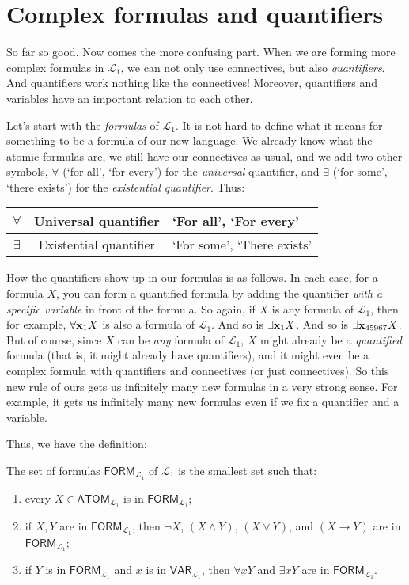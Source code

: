 \section{Complex formulas and quantifiers}

So far so good. Now comes the more confusing part. When we are forming more complex formulas in $\mathcal{L}_1$, we can not only use connectives, but also \textit{quantifiers}. And quantifiers work nothing like the connectives! Moreover, quantifiers and variables have an important relation to each other. 

Let's start with the \textit{formulas} of $\mathcal{L}_1$. It is not hard to define what it means for something to be a formula of our new language. We already know what the atomic formulas are, we still have our connectives as usual, and we add two other symbols, $\forall$ (`for all', `for every') for the \textit{universal} quantifier, and $\exists$ (`for some', `there exists') for the \textit{existential quantifier}. Thus:

\begin{center}
	\begin{tabular}{c|c|l}
		$\forall$ & Universal quantifier &`For all', `For every'\\\hline
		$\exists$ & Existential quantifier & `For some', `There exists'  
	\end{tabular}
\end{center}

How the quantifiers show up in our formulas is as follows. In each case, for a formula $X$, you can form a quantified formula by adding the quantifier \textit{with a specific variable} in front of the formula. So again, if $X$ is any formula of $\mathcal{L}_1$, then for example, $\forall \mathbf{x}_{1} X$ is also a formula of $\mathcal{L}_1$. And so is $\exists \mathbf{x}_{1} X$. And so is $\exists \mathbf{x}_{45967} X$. But of course, since $X$ can be \textit{any} formula of $\mathcal{L}_1$, $X$ might already be a \textit{quantified} formula (that is, it might already have quantifiers), and it might even be a complex formula with quantifiers and connectives (or just connectives). So this new rule of ours gets us infinitely many new formulas in a very strong sense. For example, it gets us infinitely many new formulas even if we fix a quantifier and a variable. 

Thus, we have the definition:

\begin{defn}[Formulas]
The set of formulas $\textsf{FORM}_{\mathcal{L}_1}$ of $\mathcal{L}_1$ is the smallest set such that: 
%
\begin{enumerate}
	\item every $X \in \textsf{ATOM}_{\mathcal{L}_1}$ is in $\textsf{FORM}_{\mathcal{L}_1}$;
	\item if $X, Y$ are in  $\textsf{FORM}_{\mathcal{L}_1}$, then $\neg X$, $(X \wedge Y)$, $(X \vee Y)$, and $(X \rightarrow Y)$ are in $\textsf{FORM}_{\mathcal{L}_1}$;
	\item if $Y$ is in  $\textsf{FORM}_{\mathcal{L}_1}$ and $x$ is in $\mathsf{VAR}_{\mathcal{L}_1}$, then $\forall x Y$ and $\exists x Y$ are in  $\textsf{FORM}_{\mathcal{L}_1}$.  
\end{enumerate}
\end{defn}

